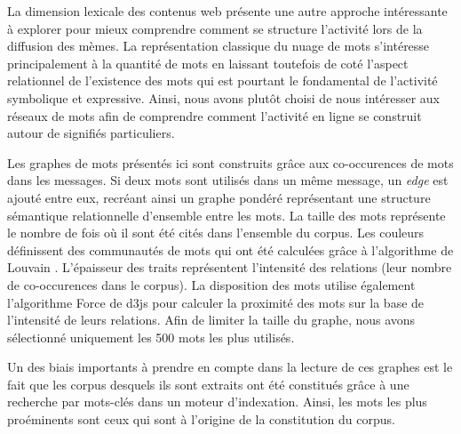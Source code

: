 La dimension lexicale des contenus web pr\'esente une autre approche int\'eressante \`a explorer pour mieux comprendre comment se structure l{\textquoteright}activit\'e lors de la diffusion des m\`emes. La repr\'esentation classique du nuage de mots s{\textquoteright}int\'eresse principalement \`a la quantit\'e de mots en laissant toutefois de cot\'e l{\textquoteright}aspect relationnel de l{\textquoteright}existence des mots qui est pourtant le fondamental de l{\textquoteright}activit\'e symbolique et expressive. Ainsi, nous avons plut\^ot choisi de nous int\'eresser aux r\'eseaux de mots afin de comprendre comment l{\textquoteright}activit\'e en ligne se construit autour de signifi\'es particuliers. 

Les graphes de mots pr\'esent\'es ici sont construits gr\^ace aux co-occurences de mots dans les messages. Si deux mots sont utilis\'es dans un m\^eme message, un \textit{edge} est ajout\'e entre eux, recr\'eant ainsi un graphe pond\'er\'e repr\'esentant une structure s\'emantique relationnelle d{\textquoteright}ensemble entre les mots. La taille des mots repr\'esente le nombre de fois o\`u il sont \'et\'e cit\'es dans l{\textquoteright}ensemble du corpus. Les couleurs d\'efinissent des communaut\'es de mots qui ont \'et\'e calcul\'ees gr\^ace \`a l{\textquoteright}algorithme de Louvain \citep{Blondel2008}. L{\textquoteright}\'epaisseur des traits repr\'esentent l{\textquoteright}intensit\'e des relations (leur nombre de co-occurences dans le corpus). La disposition des mots utilise \'egalement l{\textquoteright}algorithme Force de d3js \citep{Bostock2011} pour calculer la proximit\'e des mots sur la base de l{\textquoteright}intensit\'e de leurs relations. Afin de limiter la taille du graphe, nous avons s\'electionn\'e uniquement les 500 mots les plus utilis\'es.  

Un des biais importants \`a prendre en compte dans la lecture de ces graphes est le fait que les corpus desquels ils sont extraits ont \'et\'e constitu\'es gr\^ace \`a une recherche par mots-cl\'es dans un moteur d{\textquoteright}indexation. Ainsi, les mots les plus pro\'eminents sont ceux qui sont \`a l{\textquoteright}origine de la constitution du corpus. 

